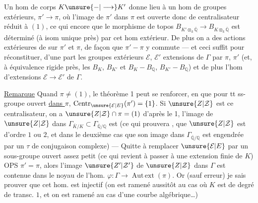 Un hom de corps $K\unsure{-|\longrightarrow}K'$ donne lieu à un hom de groupes extérieurs,
 $\pi'\longrightarrow\pi$, où l'image de $\pi'$ dans $\pi$ est ouverte donc de centralisateur réduit à $(1)$, ce qui  encore que le morphisme de topos $B_{K'\otimes_k\overline{\mathbb Q}}\longrightarrow B_{K\otimes_k\overline{\mathbb Q}}$ est déterminé (à isom unique près) par cet hom extérieur. De plus on a des actions extérieures de  sur $\pi'$ et $\pi$, de façon que $\pi'-\pi$ y commute --- et ceci suffit pour réconstituer, d'une part les groupes extérieurs $\mathcal E$, $\mathcal E'$ extensions  de $\Gamma$ par $\pi$, $\pi'$ (et, à équivalence rigide près, les $B_K$, $B_{K'}$ et $B_K-B_{\mathbb Q}$, $B_{K'}-B_{\mathbb Q}$) et de plus l'hom d'extensions  $\mathcal E\longrightarrow\mathcal E'$ de $\Gamma$.

\uline{Remarque} Quand $\pi\neq(1)$,  le théorème 1 peut se renforcer,  en  que pour tt ss-groupe  ouvert \uline{dans $\pi$}, $\operatorname{Centr}_{\unsure{\mathcal E|E}}(\pi')=\{1\}$. Si $\unsure{Z|\mathcal Z}$ est ce centralisateur, on a $\unsure{Z|\mathcal Z}\cap\pi=(1)$ d'après le 1,  l'image de $\unsure{Z|\mathcal Z}$ dans $\Gamma_{\bar K/K}\subset\Gamma_{\overline{\mathbb Q}/\mathbb Q}$ est  (ce qui prouvera  , que $\unsure{Z|\mathcal Z}$ est d'ordre $1$ ou $2$, et dans le deuxième cas que son image dans $\Gamma_{\overline{\mathbb Q}/\mathbb Q}$ est  engendrée par un $\tau$ de conjugaison complexe) --- Quitte à remplacer $\unsure{\mathcal E|E}$ par un sous-groupe ouvert assez petit (ce qui revient à passer à une extension finie de $K$) OPS $\pi'=\pi$, alors l'image $\unsure{Z'|\mathcal Z'}$ de $\unsure{Z|\mathcal Z}$ dans $\Gamma$ est contenue dans le noyau de l'hom. $\varphi:\Gamma\longrightarrow\operatorname{Aut\,ext}(\pi)$. Or (sauf erreur) je sais prouver que cet hom. est injectif (on est ramené aussitôt au cas où $K$ est de degré de transc. $1$, et on est ramené au cas  d'une courbe algébrique\ldots)

